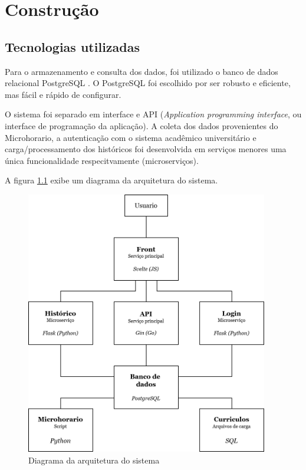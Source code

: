 \chapter{Construção}
\label{cha:Construção}

\section{Tecnologias utilizadas}
\label{sec:Tecnologias utilizadas}

Para o armazenamento e consulta dos dados, foi utilizado o banco de dados relacional PostgreSQL \cite{site-postgresql}. O PostgreSQL foi escolhido por ser robusto e eficiente, mas fácil e rápido de configurar. 

O sistema foi separado em interface e API (\textit{Application programming interface}, ou interface de programação da aplicação). A coleta dos dados provenientes do Microhorario, a autenticação com o sistema acadêmico universitário e carga/processamento dos históricos foi desenvolvida em serviços menores uma única funcionalidade respecitvamente (microserviços). 

A figura \ref{fig:diagrama-arquitetura} exibe um diagrama da arquitetura do sistema.

\begin{figure}[ht]
    \begin{center}
    \includegraphics[width=300pt]{figuras/diagrama-arquitetura.png}
    \caption{Diagrama da arquitetura do sistema}
    \label{fig:diagrama-arquitetura}
    \end{center}
\end{figure}

